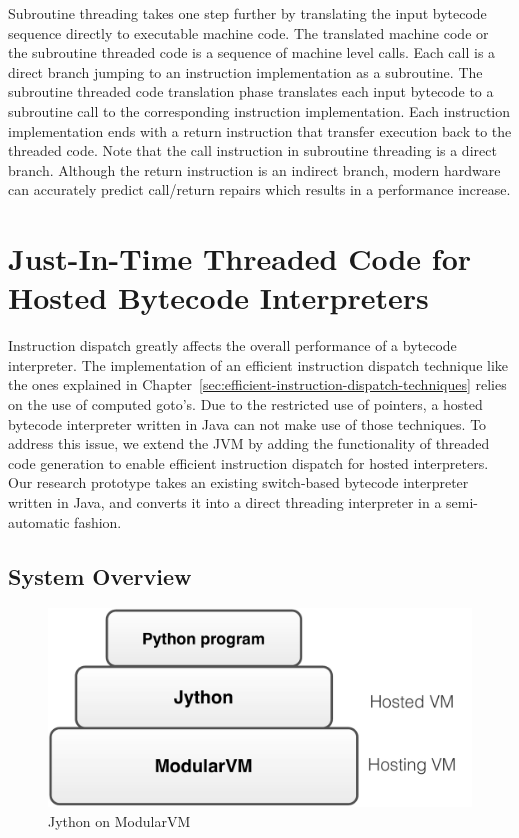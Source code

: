 Subroutine threading takes one step further by translating the input bytecode sequence directly to executable machine code.
The translated machine code or the subroutine threaded code is a sequence of machine level calls.
Each call is a direct branch jumping to an instruction implementation as a subroutine.
The subroutine threaded code translation phase translates each input bytecode to a subroutine call to the corresponding instruction implementation.
Each instruction implementation ends with a return instruction that transfer execution back to the threaded code.
Note that the call instruction in subroutine threading is a direct branch.
Although the return instruction is an indirect branch, modern hardware can accurately predict call/return repairs which results in a performance increase.

\section{Just-In-Time Threaded Code for Hosted Bytecode Interpreters}

Instruction dispatch greatly affects the overall performance of a bytecode interpreter.
The implementation of an efficient instruction dispatch technique like the ones explained in Chapter~\ref{sec:efficient-instruction-dispatch-techniques}
relies on the use of computed goto's.
Due to the restricted use of pointers, a hosted bytecode interpreter written in Java can not make use of those techniques.
To address this issue, we extend the JVM by adding the functionality of threaded code generation to enable efficient instruction dispatch for hosted interpreters.
Our research prototype takes an existing switch-based bytecode interpreter written in Java, and converts it into a direct threading interpreter in a semi-automatic fashion.

\subsection{System Overview}
\label{sec:system-overview}

\begin{figure}[th]
\centering
\includegraphics[scale=.3]{figures/ch2-jython-on-modularvm.pdf}
\caption{Jython on ModularVM}
\label{fig:jython-on-modularvm}
\end{figure}

